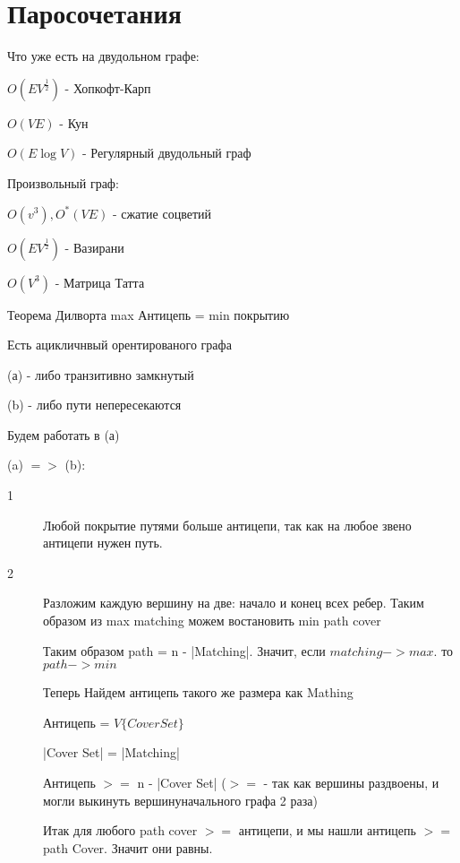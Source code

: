 ﻿

\section{Паросочетания}

Что уже есть на двудольном графе:

$O(E V^{\frac{1}{2}})$ - Хопкофт-Карп

$O(VE)$ - Кун

$O(E \log{V})$ - Регулярный двудольный граф

Произвольный граф:

$O(v^3), O^*(VE)$ - сжатие соцветий

$O(E V^{\frac{1}{2}})$ - Вазирани

$O(V^3)$ - Матрица Татта

\begin{theorem}{Теорема Дилворта}
    max Антицепь = min покрытию
\end{theorem}
\begin{lemma}{}
Есть ацикличнвый орентированого графа

(а) - либо транзитивно замкнутый

(b) - либо пути непересекаются

Будем работать в (а)

(a) $=>$ (b):


\end{lemma}

\begin{description}
\item[1] 

Любой покрытие путями больше антицепи, так как на любое звено антицепи нужен путь.

\item[2] 
Разложим каждую вершину на две: начало и конец всех ребер. Таким образом из  max matching можем востановить min path cover



Таким образом path = n - |Matching|. Значит, если $matching -> max$. то $path -> min$

Теперь Найдем антицепь такого же размера как Mathing

Антицепь = $V\{Cover Set\}$



|Cover Set| = |Matching|

Антицепь $>=$ n - |Cover Set|  ($>=$ - так как вершины раздвоены, и могли выкинуть вершинуначального графа 2 раза)

Итак для любого path cover $>=$ антицепи, и мы нашли антицепь $>=$ path Cover. Значит они равны.
\end{description}

